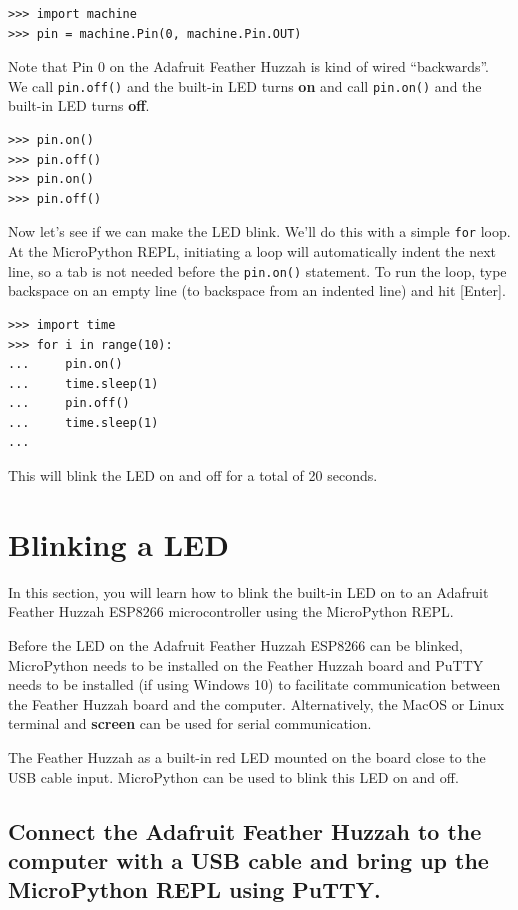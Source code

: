 \documentclass{book}
\begin{document}
\begin{lstlisting}
>>> import machine
>>> pin = machine.Pin(0, machine.Pin.OUT)
\end{lstlisting}

Note that Pin 0 on the Adafruit Feather Huzzah is kind of wired
``backwards''. We call \lstinline!pin.off()! and the built-in LED turns
\textbf{on} and call \lstinline!pin.on()! and the built-in LED turns
\textbf{off}.

\begin{lstlisting}
>>> pin.on()
>>> pin.off()
>>> pin.on()
>>> pin.off()
\end{lstlisting}

Now let's see if we can make the LED blink. We'll do this with a simple
\lstinline!for! loop. At the MicroPython REPL, initiating a loop will
automatically indent the next line, so a tab is not needed before the
\lstinline!pin.on()! statement. To run the loop, type backspace on an
empty line (to backspace from an indented line) and hit {[}Enter{]}.

\begin{lstlisting}
>>> import time
>>> for i in range(10):
...     pin.on()
...     time.sleep(1)
...     pin.off()
...     time.sleep(1)
...
\end{lstlisting}

This will blink the LED on and off for a total of 20 seconds.

    \section{Blinking a LED}\label{blinking-a-led}

    In this section, you will learn how to blink the built-in LED on to an
Adafruit Feather Huzzah ESP8266 microcontroller using the MicroPython
REPL.

Before the LED on the Adafruit Feather Huzzah ESP8266 can be blinked,
MicroPython needs to be installed on the Feather Huzzah board and PuTTY
needs to be installed (if using Windows 10) to facilitate communication
between the Feather Huzzah board and the computer. Alternatively, the
MacOS or Linux terminal and \textbf{screen} can be used for serial
communication.

    The Feather Huzzah as a built-in red LED mounted on the board close to
the USB cable input. MicroPython can be used to blink this LED on and
off.

    \subsection{Connect the Adafruit Feather Huzzah to the computer with a
USB cable and bring up the MicroPython REPL using
PuTTY.}\label{connect-the-adafruit-feather-huzzah-to-the-computer-with-a-usb-cable-and-bring-up-the-micropython-repl-using-putty.}
\end{document}
